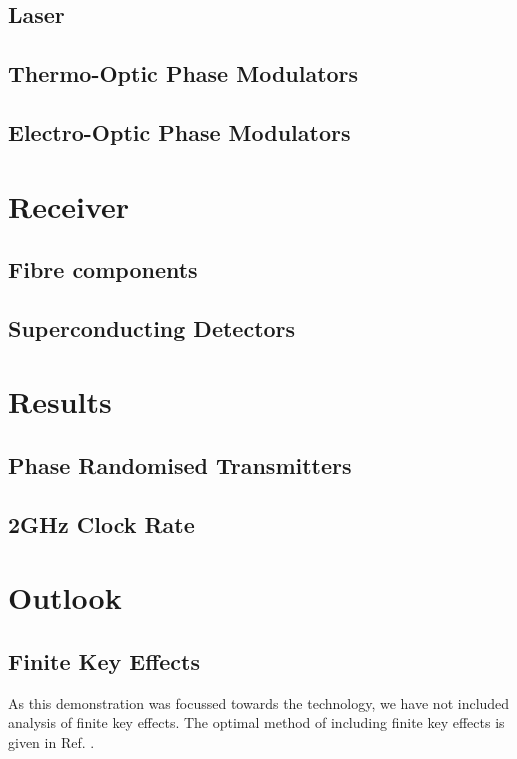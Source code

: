 \subsection{Laser}

\subsection{Thermo-Optic Phase Modulators}

\subsection{Electro-Optic Phase Modulators}

\section{Receiver}

\subsection{Fibre components}

\subsection{Superconducting Detectors}

\section{Results}

\subsection{Phase Randomised Transmitters}

\subsection{2GHz Clock Rate}

\section{Outlook}

\subsection{Finite Key Effects}

As this demonstration was focussed towards the technology, we have not included analysis of finite key effects. The optimal method of including finite key effects is given in Ref. \cite{zhou2016}.

